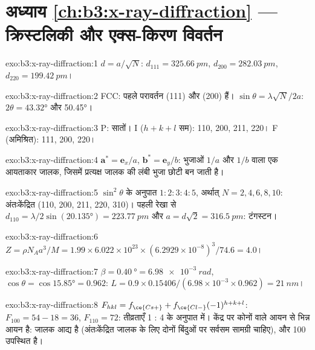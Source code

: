 \section*{अध्याय \ref{ch:b3:x-ray-diffraction} --- क्रिस्टलिकी और एक्स-किरण विवर्तन}

\begin{solution}{exo:b3:x-ray-diffraction:1}
$d = a/\sqrt N$: $d_{111} = \qty{325.66}{pm}$, $d_{200} = \qty{282.03}{pm}$, $d_{220} =
\qty{199.42}{pm}$।
\end{solution}

\begin{solution}{exo:b3:x-ray-diffraction:2}
FCC: पहले परावर्तन (111) और (200) हैं। $\sin\theta = \lambda\sqrt N/2a$: $2\theta =
\ang{43.32}$ और \ang{50.45}।
\end{solution}

\begin{solution}{exo:b3:x-ray-diffraction:3}
P: सातों। I ($h + k + l$ सम): 110, 200, 211, 220। F (अमिश्रित): 111, 200, 220।
\end{solution}

\begin{solution}{exo:b3:x-ray-diffraction:4}
$\mathbf a^* = \mathbf e_x/a$, $\mathbf b^* = \mathbf e_y/b$: भुजाओं $1/a$
और $1/b$ वाला एक आयताकार जालक, जिसमें प्रत्यक्ष जालक की लंबी भुजा छोटी बन जाती है।
\end{solution}

\begin{solution}{exo:b3:x-ray-diffraction:5}
$\sin^2\theta$ के अनुपात $1 : 2 : 3 : 4 : 5$, अर्थात् $N = 2, 4, 6, 8, 10$: अंतःकेंद्रित (110,
200, 211, 220, 310)। पहली रेखा से $d_{110} = \lambda/2\sin(\ang{20.135}) =
\qty{223.77}{pm}$ और $a = d\sqrt2 = \qty{316.5}{pm}$: टंगस्टन।
\end{solution}

\begin{solution}{exo:b3:x-ray-diffraction:6}
$Z = \rho N_Aa^3/M = 1.99 \times 6.022\times10^{23} \times (6.2929\times10^{-8})^3/74.6 = 4.0$।
\end{solution}

\begin{solution}{exo:b3:x-ray-diffraction:7}
$\beta = \qty{0.40}{\degree} = \qty{6.98e-3}{rad}$, $\cos\theta = \cos\ang{15.85} = 0.962$:
$L = 0.9 \times 0.15406/(6.98\times10^{-3} \times 0.962) = \qty{21}{nm}$।
\end{solution}

\begin{solution}{exo:b3:x-ray-diffraction:8}
$F_{hkl} = f_{\ce{Cs+}} + f_{\ce{Cl-}}(-1)^{h+k+l}$: $F_{100} = 54 - 18 = 36$, $F_{110} = 72$:
तीव्रताएँ 1 : 4 के अनुपात में। केंद्र पर कोनों वाले आयन से भिन्न आयन
है: जालक आद्य है (अंतःकेंद्रित जालक के लिए दोनों बिंदुओं पर सर्वसम
सामग्री चाहिए), और 100 उपस्थित है।
\end{solution}

